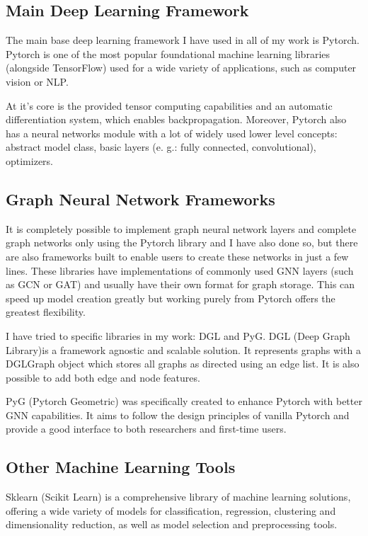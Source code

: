 	\subsection{Main Deep Learning Framework}
	
	The main base deep learning framework I have used in all of my work is Pytorch. Pytorch is one of the most popular foundational machine learning libraries (alongside TensorFlow) used for a wide variety of applications, such as computer vision or NLP. 
	
	At it's core is the provided tensor computing capabilities and an automatic differentiation system, which enables backpropagation. Moreover, Pytorch also has a neural networks module with a lot of widely used lower level concepts: abstract model class, basic layers (e. g.: fully connected, convolutional), optimizers.
	
	\subsection{Graph Neural Network Frameworks}
	
	It is completely possible to implement graph neural network layers and complete graph networks only using the Pytorch library and I have also done so, but there are also frameworks built to enable users to create these networks in just a few lines. These libraries have implementations of commonly used GNN layers (such as GCN or GAT) and usually have their own format for graph storage. This can speed up model creation greatly but working purely from Pytorch offers the greatest flexibility.
	
	I have tried to specific libraries in my work: DGL and PyG. DGL (Deep Graph Library)is a framework agnostic and scalable solution. It represents graphs with a DGLGraph object which stores all graphs as directed using an edge list. It is also possible to add both edge and node features.
	
	PyG (Pytorch Geometric) was specifically created to enhance Pytorch with better GNN capabilities. It aims to follow the design principles of vanilla Pytorch and provide a good interface to both researchers and first-time users.  
	
	\subsection{Other Machine Learning Tools}
	
	Sklearn (Scikit Learn) is a comprehensive library of machine learning solutions, offering a wide variety of models for classification, regression, clustering and dimensionality reduction, as well as model selection and preprocessing tools.
	
